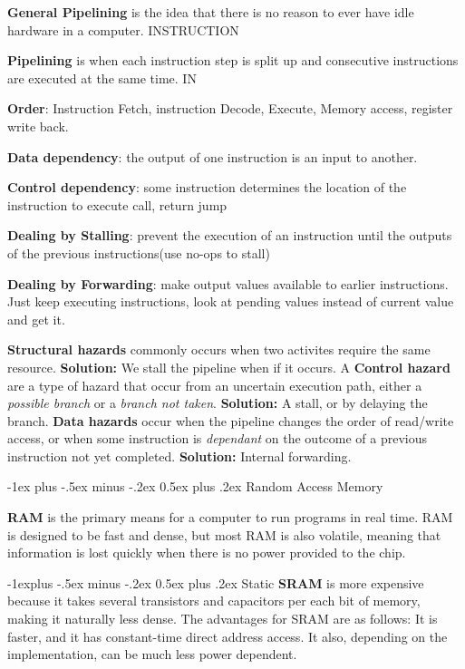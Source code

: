 \documentclass[10pt,landscape]{article}
\makeatletter
\renewcommand{\section}{\@startsection{section}{1}{0mm}%
                                {-1ex plus -.5ex minus -.2ex}%
                                {0.5ex plus .2ex}%
                                {\normalfont\large\bfseries}}
\renewcommand{\subsection}{\@startsection{subsection}{2}{0mm}%
                                {-1explus -.5ex minus -.2ex}%
                                {0.5ex plus .2ex}%
                                {\normalfont\normalsize\bfseries}}
\makeatother
\begin{document}
\begin{multicols}{3}
{\bf General Pipelining} is the idea that there is no reason to ever have idle hardware in a computer. INSTRUCTION 

{\bf Pipelining} is when each instruction step is split up and consecutive instructions are executed at the same time. IN 

{\bf Order}: Instruction Fetch, instruction Decode, Execute, Memory access, register write back.

{\bf Data dependency}: the output of one instruction is an input to another.

{\bf Control dependency}: some instruction determines the location of the instruction to execute call, return jump

{\bf Dealing by Stalling}: prevent the execution of an instruction until the outputs of the previous instructions(use no-ops to stall)

{\bf Dealing by Forwarding}: make output values available to earlier instructions. Just keep executing instructions, look at pending values instead of 
current value and get it.

\textbf{Structural hazards} commonly occurs when two activites require the same resource. \textbf{Solution:} We stall the pipeline when if it occurs.
A \textbf{Control hazard} are a type of hazard that occur from an uncertain execution path,
either a \textit{possible branch} or a \textit{branch not taken}. \textbf{Solution:} A stall, or by delaying the branch.
\textbf{Data hazards} occur when the pipeline changes the order of read/write access, 
or when some instruction is \textit{dependant} on the outcome of a previous instruction 
not yet completed. \textbf{Solution:} Internal forwarding.

\section{Random Access Memory}

{\bf RAM} is the primary means for a computer to run programs in real time. RAM is designed to be fast and dense, but most RAM is also volatile, meaning that information is lost quickly when there is no power provided to the chip.

\subsection{Static}
{\bf SRAM} is more expensive because it takes several transistors and capacitors per each bit of memory, making it naturally less dense. The advantages for SRAM are as follows: It is faster, and it has constant-time direct address access. It also, depending on the implementation, can be much less power dependent.


\end{multicols}
\end{document}
